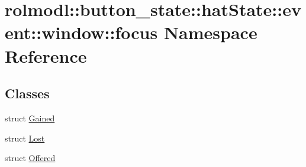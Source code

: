 \hypertarget{namespacerolmodl_1_1button__state_1_1hat_state_1_1event_1_1window_1_1focus}{}\section{rolmodl\+::button\+\_\+state\+::hat\+State\+::event\+::window\+::focus Namespace Reference}
\label{namespacerolmodl_1_1button__state_1_1hat_state_1_1event_1_1window_1_1focus}
\subsection*{Classes}
\begin{DoxyCompactItemize}
\item 
struct \mbox{\hyperlink{structrolmodl_1_1button__state_1_1hat_state_1_1event_1_1window_1_1focus_1_1_gained}{Gained}}
\item 
struct \mbox{\hyperlink{structrolmodl_1_1button__state_1_1hat_state_1_1event_1_1window_1_1focus_1_1_lost}{Lost}}
\item 
struct \mbox{\hyperlink{structrolmodl_1_1button__state_1_1hat_state_1_1event_1_1window_1_1focus_1_1_offered}{Offered}}
\end{DoxyCompactItemize}
